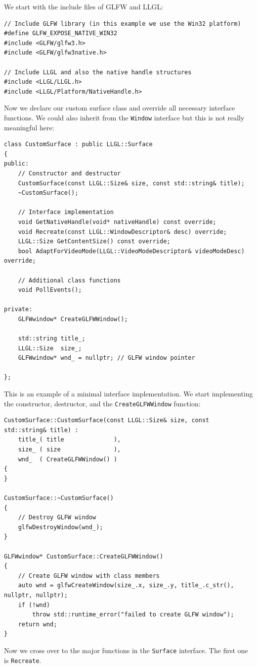 \documentclass{article}
\begin{document}
We start with the include files of GLFW and LLGL:
\begin{lstlisting}
// Include GLFW library (in this example we use the Win32 platform)
#define GLFW_EXPOSE_NATIVE_WIN32
#include <GLFW/glfw3.h>
#include <GLFW/glfw3native.h>

// Include LLGL and also the native handle structures
#include <LLGL/LLGL.h>
#include <LLGL/Platform/NativeHandle.h>
\end{lstlisting}
Now we declare our custom surface class and override all necessary interface functions.
We could also inherit from the \texttt{Window} interface but this is not really meaningful here:
\begin{lstlisting}
class CustomSurface : public LLGL::Surface
{
public:
	// Constructor and destructor
	CustomSurface(const LLGL::Size& size, const std::string& title);
	~CustomSurface();
	
	// Interface implementation
	void GetNativeHandle(void* nativeHandle) const override;
	void Recreate(const LLGL::WindowDescriptor& desc) override;
	LLGL::Size GetContentSize() const override;
	bool AdaptForVideoMode(LLGL::VideoModeDescriptor& videoModeDesc) override;
	
	// Additional class functions
	void PollEvents();
	
private:
	GLFWwindow* CreateGLFWWindow();
	
	std::string title_;
	LLGL::Size  size_;
	GLFWwindow* wnd_ = nullptr; // GLFW window pointer
	
};
\end{lstlisting}
This is an example of a minimal interface implementation.
We start implementing the constructor, destructor, and the \texttt{CreateGLFWWindow} function:
\begin{lstlisting}
CustomSurface::CustomSurface(const LLGL::Size& size, const std::string& title) :
	title_( title              ),
	size_ ( size               ),
	wnd_  ( CreateGLFWWindow() )
{
}

CustomSurface::~CustomSurface()
{
	// Destroy GLFW window
	glfwDestroyWindow(wnd_);
}

GLFWwindow* CustomSurface::CreateGLFWWindow()
{
	// Create GLFW window with class members
	auto wnd = glfwCreateWindow(size_.x, size_.y, title_.c_str(), nullptr, nullptr);
	if (!wnd)
		throw std::runtime_error("failed to create GLFW window");
	return wnd;
}
\end{lstlisting}
Now we cross over to the major functions in the \texttt{Surface} interface. The first one is \texttt{Recreate}.
\end{document}
